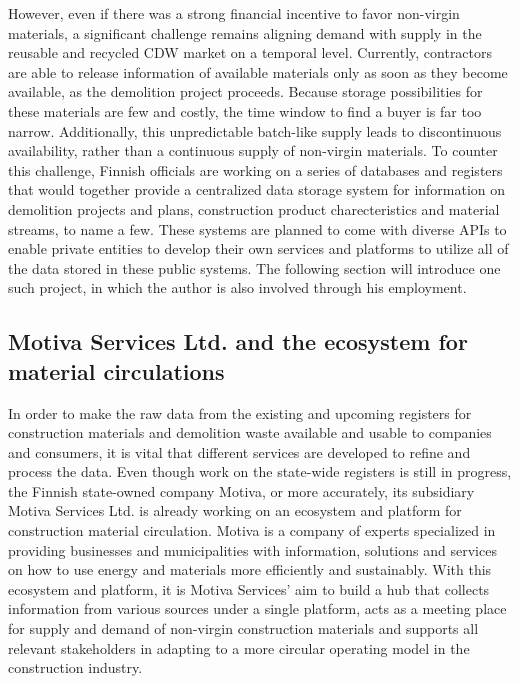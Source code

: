 \documentclass[english, 12pt, a4paper, sci, utf8, a-2b, online]{aaltothesis}
\begin{document}
However, even if there was a strong financial incentive to favor non-virgin materials, a significant challenge remains aligning demand
with supply in the reusable and recycled CDW market on a temporal level. Currently, contractors are able to release information of available materials only as soon as they become available,
as the demolition project proceeds. Because storage possibilities for these materials are few and costly, the time window to find a buyer is far too narrow. Additionally, this unpredictable
batch-like supply leads to discontinuous availability, rather than a continuous supply of non-virgin materials. To counter this challenge,
Finnish officials are working on a series of databases and registers that would together provide a centralized data storage system for information on demolition projects and plans, construction
product charecteristics and material streams, to name a few. These systems are planned to come with diverse APIs to enable private entities to develop their own services and platforms to
utilize all of the data stored in these public systems. The following section will introduce one such project, in which the author is also involved through his employment.

\subsection{Motiva Services Ltd. and the ecosystem for material circulations} \label{motiva}

In order to make the raw data from the existing and upcoming registers for construction materials and demolition waste available and usable to companies and
consumers, it is vital that different services are developed to refine and process the data. Even though work on the state-wide registers is still in progress, the Finnish state-owned
company Motiva, or more accurately, its subsidiary Motiva Services Ltd. is already working on an ecosystem and platform for construction material circulation. Motiva is a company of experts
specialized in providing businesses and municipalities
with information, solutions and services on how to use energy and materials more efficiently and sustainably. With this ecosystem and platform, it is Motiva Services' aim to build a hub that collects
information from various sources under a single platform, acts as a meeting place for supply and demand of non-virgin construction materials and supports all relevant stakeholders in adapting to
a more circular operating model in the construction industry.
\end{document}
